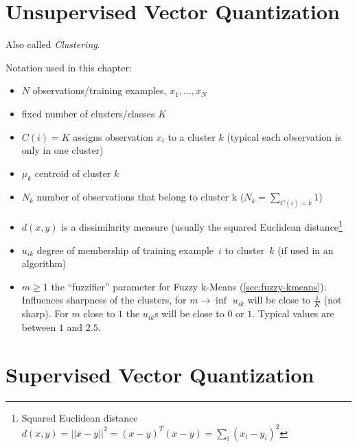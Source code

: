\chapter{Unsupervised Vector Quantization}\label{chapter:clustering}
Also called \emph{Clustering}.

Notation used in this chapter:
\begin{itemize}
    \item $N$ observations/training examples, $x_1, \dots, x_N$
    \item fixed number of clusters/classes $K$
    \item $C(i) = K$ assigns observation $x_i$ to a cluster $k$ (typical each
          observation is only in one cluster)
    \item $\mu_k$ centroid of cluster $k$
    \item $N_k$ number of observations that belong to cluster k
          ($N_k = \sum\limits_{C(i)=k} 1$)
    \item $d(x, y)$ is a dissimilarity measure (usually the squared Euclidean distance\footnote{Squared Euclidean distance $d(x, y) = ||x-y||^2 = (x-y)^T (x-y) = \sum_i (x_i-y_i)^2$}
    \item $u_{ik}$ degree of membership of training example~$i$ to cluster~$k$
          (if used in an algorithm)
    \item $m \geq 1$ the \enquote{fuzzifier} parameter for Fuzzy k-Means
          (\cref{sec:fuzzy-kmeans}). Influences sharpness of the clusters, for
          $m \to \inf$ $u_{ik}$ will be close to $\frac{1}{K}$ (not sharp). For
          $m$ close to $1$ the $u_{ik}$s will be close to $0$ or $1$. Typical
          values are between $1$ and $2.5$.
\end{itemize}







\chapter{Supervised Vector Quantization}\label{chapter:lvq}





